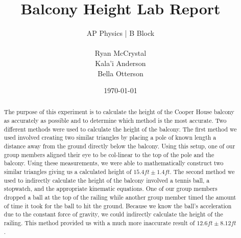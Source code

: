 \documentclass[12pt]{article}
\begin{document}
\title{Balcony Height Lab Report}
\author{AP Physics | B Block\\
\\
Ryan McCrystal\\
Kala'i Anderson\\
Bella Otterson}
\date{\today}
\maketitle
\newpage
\begin{abstract} %
The purpose of this experiment is to calculate the height of the Cooper House balcony as accurately as possible and to determine which method is the most accurate. Two different methods were used to calculate the height of the balcony. The first method we used involved creating two similar triangles by placing a pole of known length a distance away from the ground directly below the balcony. Using this setup, one of our group members aligned their eye to be col-linear to the top of the pole and the balcony. Using these measurements, we were able to mathematically construct two similar triangles giving us a calculated height of $15.4ft\pm1.4ft$. The second method we used to indirectly calculate the height of the balcony involved a tennis ball, a stopwatch, and the appropriate kinematic equations. One of our group members dropped a ball at the top of the railing while another group member timed the amount of time it took for the ball to hit the ground. Because we know the ball's acceleration due to the constant force of gravity, we could indirectly calculate the height of the railing. This method provided us with a much more inaccurate result of  $12.6ft\pm8.12ft$. 
\end{abstract}
\newpage
\end{document}
